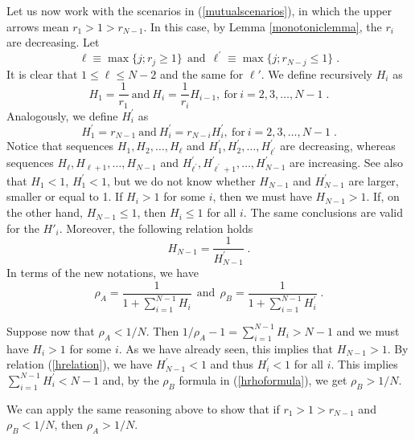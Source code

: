 \documentclass[12pt]{article}
\begin{document}
Let us now work with the scenarios in (\ref{mutualscenarios}), in which the upper arrows mean $ r_1> 1 > r_{N-1}$. In this case, by Lemma \ref{monotoniclemma}, the $r_i$ are decreasing. Let
\begin{equation*} \ell\equiv \max\{j;r_j\geq1\} \ \ \text{and} \ \ \ell^{\prime}\equiv \max\{j;r_{N-j}\leq1\} \;.
\end{equation*} 
It is clear that $1 \leq \ell \leq N-2$ and the same for $\ell'$. 
We define recursively $ H_i $ as 
\begin{equation*}
H_1=\frac{1}{r_1} \ \text{and} \  H_i=\frac{1}{r_i}H_{i-1}, \ \text{for} \  i=2, 3,\ldots, N-1\;.
\end{equation*}
Analogously, we define $ H^{\prime}_i $ as
\begin{equation*}
H^{\prime}_1=r_{N-1} \ \text{and} \  H^{\prime}_i=r_{N-i}H^{\prime}_i ,\ \text{for} \ i=2,3,\ldots, N-1\;.
\end{equation*}
Notice that sequences $ H_1, H_2,\ldots,H_{\ell} $ and $ H^{\prime}_1, H^{\prime}_2,\ldots,H^{\prime}_{\ell^{\prime}} $ are decreasing, whereas sequences $H_{\ell}, H_{\ell+1},\ldots,H_{N-1} $ and $ H^{\prime}_{\ell^{\prime}}, H^{\prime}_{\ell^{\prime}+1},\ldots,H^{\prime}_{N-1} $ are increasing. See also that $ H_1 < 1 $, $ H^{\prime}_1 < 1 $, but we do not know whether $ H_{N-1} $ and $ H^{\prime}_{N-1} $ are larger, smaller or equal to 1. If $H_i>1$ for some $i$, then we must have $H_{N-1}>1$. If, on the other hand, $H_{N-1}\leq 1$, then $H_i\leq 1$ for all $i$. The same conclusions are valid for the $H'_i$. Moreover, the following relation holds
\begin{equation}\label{hrelation}
H_{N-1}=\frac{1}{H^{\prime}_{N-1}}\;.
\end{equation}
In terms of the new notations, we have  
\begin{equation}\label{hrhoformula}
\rho_A=\frac{1}{1+\sum_{i=1}^{N-1}H_i} \ \ \text{and} \ \ \rho_B=\frac{1}{1+\sum_{i=1}^{N-1}H^{\prime}_i}\;.
\end{equation}

Suppose now that $ \rho_A<1/N $. Then $1/\rho_A-1=\sum_{i=1}^{N-1}H_i>N-1 $ and we must have $H_i>1$ for some $i$. As we have already seen, this implies that $ H_{N-1}>1 $. By relation (\ref{hrelation}), we have $ H^{\prime}_{N-1}<1 $ and thus $ H^{\prime}_i<1 $ for all $ i$. This implies $ \sum_{i=1}^{N-1}H^{\prime}_i<N-1 $ and, by the $ \rho_B $ formula in (\ref{hrhoformula}), we get $ \rho_B>1/N $. 

We can apply the same reasoning above to show that if $ r_1> 1> r_{N-1} $ and $ \rho_B<1/N $, then $ \rho_A>1/N $.
\end{document}
